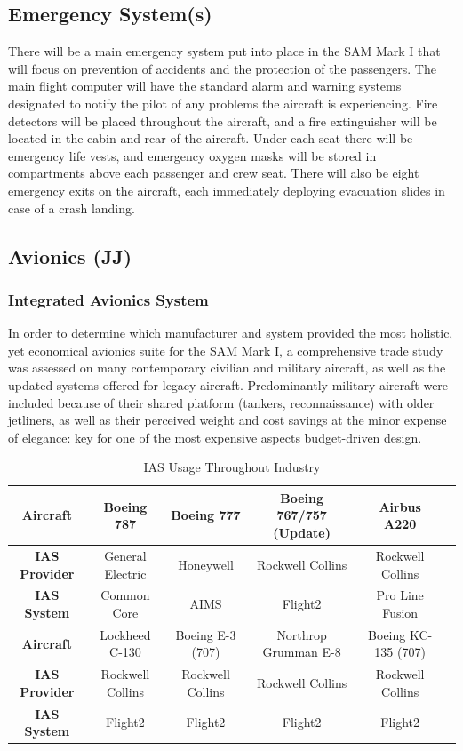 \subsection{Emergency System(s)}
There will be a main emergency system put into place in the SAM Mark I that will focus on prevention of accidents and the protection of the passengers. The main flight computer will have the standard alarm and warning systems designated to notify the pilot of any problems the aircraft is experiencing. Fire detectors will be placed throughout the aircraft, and a fire extinguisher will be located in the cabin and rear of the aircraft. Under each seat there will be emergency life vests, and emergency oxygen masks will be stored in compartments above each passenger and crew seat. There will also be eight emergency exits on the aircraft, each immediately deploying evacuation slides in case of a crash landing. 

\subsection{Avionics (JJ)}
\subsubsection{Integrated Avionics System}
In order to determine which manufacturer and system provided the most holistic, yet economical avionics suite for the SAM Mark I, a comprehensive trade study was assessed on many contemporary civilian and military aircraft, as well as the updated systems offered for legacy aircraft.  Predominantly military aircraft were included because of their shared platform (tankers, reconnaissance) with older jetliners, as well as their perceived weight and cost savings at the minor expense of elegance: key for one of the most expensive aspects budget-driven design. 

\begin{table}[!h] 
    \centering
    \caption{IAS Usage Throughout Industry}
    \begin{tabular}{ |c||c|c|c|c|c|}\toprule
    \textbf{Aircraft}  & Boeing 787 & Boeing 777 & Boeing 767/757 (Update) & Airbus A220 \\\hline 
    \textbf{IAS Provider} & General Electric & Honeywell & Rockwell Collins & Rockwell Collins  \\\hline
    \textbf{IAS System} & Common Core & AIMS & Flight2 & Pro Line Fusion \\\hline \hline
    \textbf{Aircraft}  & Lockheed C-130 & Boeing E-3 (707) & Northrop Grumman E-8 & Boeing KC-135 (707) \\\hline
    \textbf{IAS Provider} & Rockwell Collins & Rockwell Collins & Rockwell Collins & Rockwell Collins  \\\hline
    \textbf{IAS System} & Flight2 & Flight2 & Flight2 & Flight2
    \\ \bottomrule
    \end{tabular}\label{tab:ias}
\end{table}

